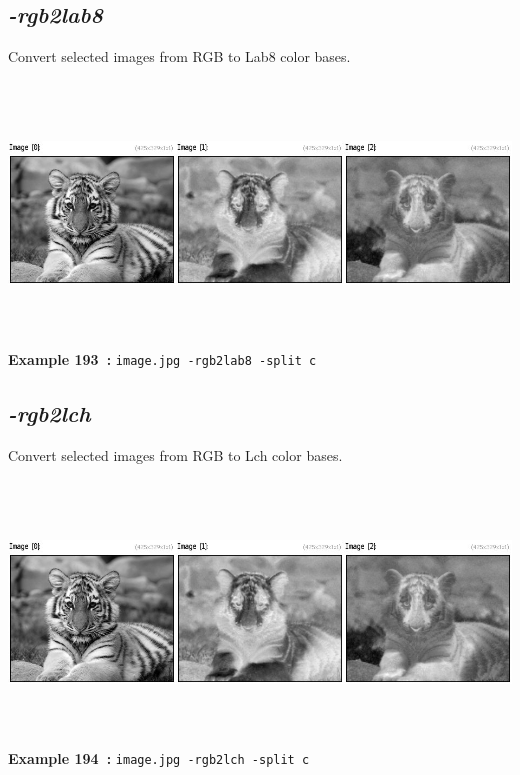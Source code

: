 \documentclass[a4paper,11pt,twoside]{book}
\begin{document}
\subsection{\emph{-rgb2lab8} }\vspace*{-0.5em}
Convert selected images from RGB to Lab8 color bases.
\begin{center}\includegraphics[keepaspectratio=true,height=7cm,width=\textwidth]{img/gmic_def193.jpg}\\
{\footnotesize \textbf{Example 193~:} \texttt{image.jpg -rgb2lab8 -split c}}
\end{center}

\subsection{\emph{-rgb2lch} }\vspace*{-0.5em}
Convert selected images from RGB to Lch color bases.
\begin{center}\includegraphics[keepaspectratio=true,height=7cm,width=\textwidth]{img/gmic_def194.jpg}\\
{\footnotesize \textbf{Example 194~:} \texttt{image.jpg -rgb2lch -split c}}
\end{center}
\end{document}
